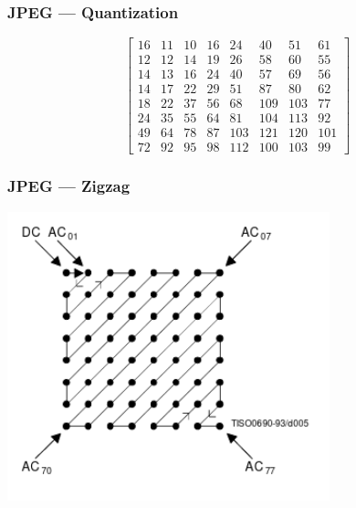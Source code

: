 \documentclass{beamer}
\begin{document}
\begin{frame}
    \frametitle{JPEG — Quantization}
    $$
        \begin{bmatrix}
            16 & 11 & 10 & 16 & 24  & 40  & 51  & 61  \\
            12 & 12 & 14 & 19 & 26  & 58  & 60  & 55  \\
            14 & 13 & 16 & 24 & 40  & 57  & 69  & 56  \\
            14 & 17 & 22 & 29 & 51  & 87  & 80  & 62  \\
            18 & 22 & 37 & 56 & 68  & 109 & 103 & 77  \\
            24 & 35 & 55 & 64 & 81  & 104 & 113 & 92  \\
            49 & 64 & 78 & 87 & 103 & 121 & 120 & 101 \\
            72 & 92 & 95 & 98 & 112 & 100 & 103 & 99
        \end{bmatrix}
    $$
\end{frame}

\begin{frame}
    \frametitle{JPEG — Zigzag}
    \begin{center}
        \includegraphics[width=0.7\textwidth]{zigzag.png}
    \end{center}
\end{frame}
\end{document}
